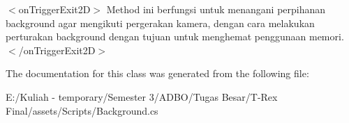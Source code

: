 $<$on\+Trigger\+Exit2\+D$>$ Method ini berfungsi untuk menangani perpihanan background agar mengikuti pergerakan kamera, dengan cara melakukan perturakan background dengan tujuan untuk menghemat penggunaan memori. $<$/on\+Trigger\+Exit2\+D$>$ 

The documentation for this class was generated from the following file\+:\begin{DoxyCompactItemize}
\item 
E\+:/\+Kuliah -\/ temporary/\+Semester 3/\+A\+D\+B\+O/\+Tugas Besar/\+T-\/\+Rex Final/assets/\+Scripts/Background.\+cs\end{DoxyCompactItemize}
